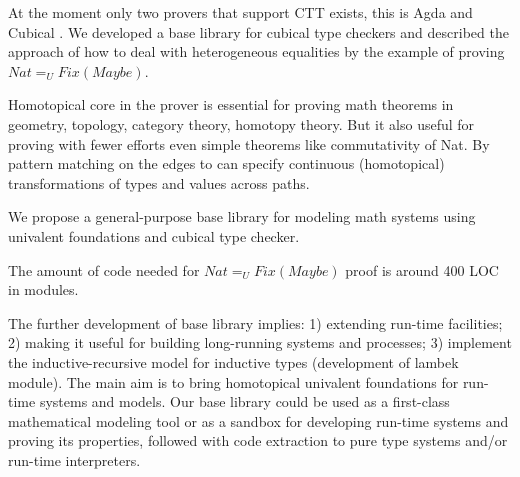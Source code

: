 \documentclass{article}
\begin{document}
At the moment only two provers that support CTT exists, this is Agda \cite{Ulf09} and Cubical \cite{Mortberg17}.
We developed a base library for cubical type checkers and described the approach
of how to deal with heterogeneous equalities by the example of proving $Nat =_U Fix(Maybe)$.

Homotopical core in the prover is essential for proving math theorems in geometry,
topology, category theory, homotopy theory. But it also useful
for proving with fewer efforts even simple theorems like commutativity of Nat. By pattern matching
on the edges to can specify continuous (homotopical) transformations of types
and values across paths.

We propose a general-purpose base library for modeling math systems using univalent foundations
and cubical type checker.

The amount of code needed for $Nat =_U Fix(Maybe)$ proof is around 400 LOC in modules.

The further development of base library implies:
1) extending run-time facilities;
2) making it useful for building long-running systems and processes;
3) implement the inductive-recursive model for inductive types (development of lambek module).
The main aim is to bring homotopical univalent foundations for run-time systems and models.
Our base library could be used as a first-class mathematical modeling tool or as a sandbox
for developing run-time systems and proving its properties, followed with code extraction
to pure type systems and/or run-time interpreters.



\end{document}
